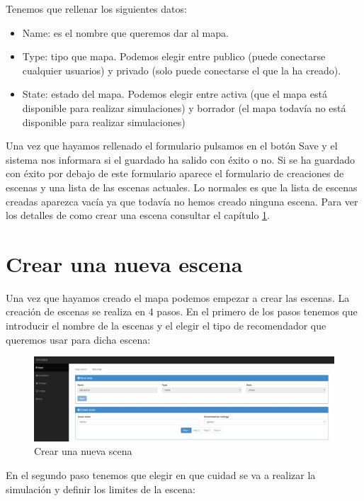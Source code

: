 Tenemos que rellenar los siguientes datos:

\begin{itemize}
	\item Name: es el nombre que queremos dar al mapa.
	\item Type: tipo que mapa. Podemos elegir entre publico (puede conectarse cualquier usuarios) y privado (solo puede conectarse el que la ha creado).
	\item State: estado del mapa. Podemos elegir entre activa (que el mapa está disponible para realizar simulaciones) y borrador (el mapa todavía no está disponible para realizar simulaciones)
\end{itemize}

Una vez que hayamos rellenado el formulario pulsamos en el botón Save y el sistema nos informara si el guardado ha salido con éxito o no. Si se ha guardado con éxito por debajo de este formulario aparece el formulario de creaciones de escenas y una lista de las escenas actuales. Lo normales es que la lista de escenas creadas aparezca vacía ya que todavía no hemos creado ninguna escena. Para ver los detalles de como crear una escena consultar el capítulo \ref{sec:crearEscena}.

\section{Crear una nueva escena}\label{sec:crearEscena}

Una vez que hayamos creado el mapa podemos empezar a crear las escenas. La creación de escenas se realiza en 4 pasos. En el primero de los pasos tenemos que introducir el nombre de la escenas y el elegir el tipo de recomendador que queremos usar para dicha escena:

\begin{figure}[H]
	\centering\includegraphics[scale=0.25]{imagenes/capitulo9/crear-escena-1.jpg}
	\caption{Crear una nueva scena}
	\label{img:AddScena1}
\end{figure}

En el segundo paso tenemos que elegir en que cuidad se va a realizar la simulación y definir los limites de la escena:

